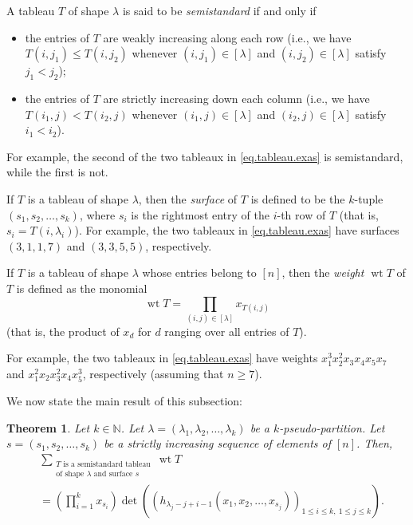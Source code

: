 \documentclass[reqno]{amsart}%
\newcommand{\0}{\phantom{c}}
\let\sumnonlimits\sum
\let\prodnonlimits\prod
\renewcommand{\sum}{\sumnonlimits\limits}
\renewcommand{\prod}{\prodnonlimits\limits}
\newcommand{\defn}[1]{{\color{darkred}\emph{#1}}}
\theoremstyle{plain}
\newtheorem{thm}{Theorem}[section]
\theoremstyle{definition}
\numberwithin{equation}{section}
\begin{document}
A tableau $T$ of shape $\lambda$ is said to be \defn{semistandard} if and only if

\begin{itemize}
\item the entries of $T$ are weakly increasing along each row (i.e., we have
$T\left(  i,j_{1}\right)  \leq T\left(  i,j_{2}\right)  $ whenever $\left(
i,j_{1}\right)  \in\left[  \lambda\right]  $ and $\left(  i,j_{2}\right)
\in\left[  \lambda\right]  $ satisfy $j_{1}<j_{2}$);

\item the entries of $T$ are strictly increasing down each column (i.e., we
have $T\left(  i_{1},j\right)  <T\left(  i_{2},j\right)  $ whenever $\left(
i_{1},j\right)  \in\left[  \lambda\right]  $ and $\left(  i_{2},j\right)
\in\left[  \lambda\right]  $ satisfy $i_{1}<i_{2}$).
\end{itemize}

For example, the second of the two tableaux in \eqref{eq.tableau.exas} is
semistandard, while the first is not.

If $T$ is a tableau of shape $\lambda$, then the \defn{surface} of $T$ is
defined to be the $k$-tuple $\left(  s_{1},s_{2},\ldots,s_{k}\right)  $, where
$s_{i}$ is the rightmost entry of the $i$-th row of $T$ (that is,
$s_{i}=T\left(  i,\lambda_{i}\right)  $). For example, the two tableaux in
\eqref{eq.tableau.exas} have surfaces $\left(  3,1,1,7\right)  $ and $\left(
3,3,5,5\right)  $, respectively.

If $T$ is a tableau of shape $\lambda$ whose entries belong to $\left[
n\right]  $, then the \defn{weight $\operatorname{wt} T$} of $T$ is defined as
the monomial%
\[
\operatorname*{wt}T=\prod_{\left(  i,j\right)  \in\left[  \lambda\right]
}x_{T\left(  i,j\right)  }%
\]
(that is, the product of $x_{d}$ for $d$ ranging over all entries of $T$).

For example, the two tableaux in \eqref{eq.tableau.exas} have weights
$x_{1}^{3}x_{2}^{2}x_{3}x_{4}x_{5}x_{7}$ and $x_{1}^{2}x_{2}x_{3}^{2}%
x_{4}x_{5}^{3}$, respectively (assuming that $n\geq7$).

We now state the main result of this subsection:

\begin{thm}
\label{thm.tableau.jt}Let $k\in\mathbb{N}$. Let $\lambda=\left(  \lambda
_{1},\lambda_{2},\ldots,\lambda_{k}\right)  $ be a $k$-pseudo-partition. Let
$s=\left(  s_{1},s_{2},\ldots,s_{k}\right)  $ be a strictly increasing
sequence of elements of $\left[  n\right]  $. Then,%
\begin{align*}
&  \sum_{\substack{T\text{ is a semistandard tableau}\\\text{of shape }%
\lambda\text{ and surface }s}}\operatorname*{wt}T\\
&  =\left(  \prod_{i=1}^{k}x_{s_{i}}\right)  \det\left(  \left(
h_{\lambda_{j}-j+i-1}\left(  x_{1},x_{2},\ldots,x_{s_{j}}\right)  \right)
_{1\leq i\leq k,\ 1\leq j\leq k}\right)  .
\end{align*}

\end{thm}
\end{document}

